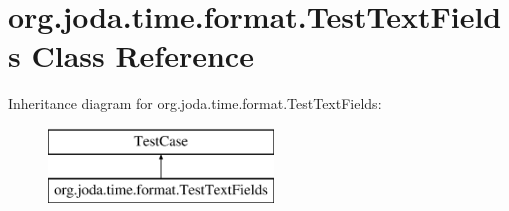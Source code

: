 \hypertarget{classorg_1_1joda_1_1time_1_1format_1_1_test_text_fields}{\section{org.\-joda.\-time.\-format.\-Test\-Text\-Fields Class Reference}
\label{classorg_1_1joda_1_1time_1_1format_1_1_test_text_fields}
}
Inheritance diagram for org.\-joda.\-time.\-format.\-Test\-Text\-Fields\-:\begin{figure}[H]
\begin{center}
\leavevmode
\includegraphics[height=2.000000cm]{classorg_1_1joda_1_1time_1_1format_1_1_test_text_fields}
\end{center}
\end{figure}
